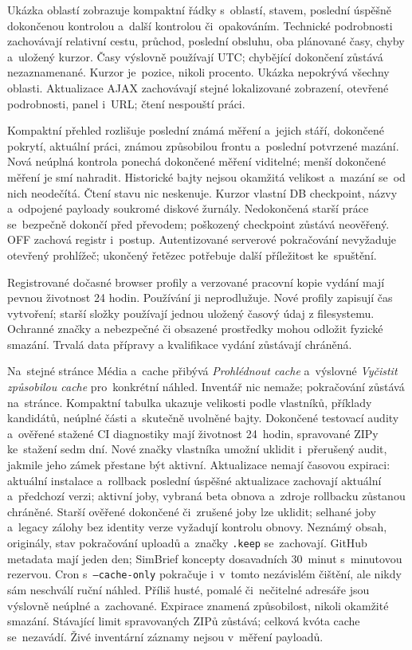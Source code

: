 \documentclass[11pt,a4paper]{article}
\begin{document}
Ukázka oblastí zobrazuje kompaktní řádky s~oblastí, stavem, poslední úspěšně
dokončenou kontrolou a~další kontrolou či~opakováním. Technické podrobnosti
zachovávají relativní cestu, průchod, poslední obsluhu, oba plánované časy,
chyby a~uložený kurzor. Časy výslovně používají UTC; chybějící dokončení zůstává
nezaznamenané. Kurzor je~pozice, nikoli procento. Ukázka nepokrývá všechny
oblasti. Aktualizace AJAX zachovávají stejné lokalizované zobrazení, otevřené
podrobnosti, panel i~URL; čtení nespouští práci.

Kompaktní přehled rozlišuje poslední známá měření a~jejich stáří, dokončené
pokrytí, aktuální práci, známou způsobilou frontu a~poslední potvrzené mazání.
Nová neúplná kontrola ponechá dokončené měření viditelné; menší dokončené měření
je smí nahradit. Historické bajty nejsou okamžitá velikost a~mazání se~od nich
neodečítá. Čtení stavu nic neskenuje. Kurzor vlastní DB checkpoint, názvy
a~odpojené payloady soukromé diskové žurnály. Nedokončená starší práce
se~bezpečně dokončí před převodem; poškozený checkpoint zůstává neověřený. OFF
zachová registr i~postup. Autentizované serverové pokračování nevyžaduje
otevřený prohlížeč; ukončený řetězec potřebuje další příležitost ke~spuštění.

Registrované dočasné browser profily a verzované pracovní kopie vydání mají
pevnou životnost 24 hodin. Používání ji neprodlužuje. Nové profily zapisují čas
vytvoření; starší složky používají jednou uložený časový údaj z filesystemu.
Ochranné značky a nebezpečné či obsazené prostředky mohou odložit fyzické
smazání.
Trvalá data přípravy a kvalifikace vydání zůstávají chráněná.

Na~stejné stránce Média a~cache přibývá \emph{Prohlédnout cache} a~výslovné
\emph{Vyčistit způsobilou cache} pro~konkrétní náhled. Inventář nic nemaže;
pokračování zůstává na~stránce. Kompaktní tabulka ukazuje velikosti podle
vlastníků,
příklady kandidátů, neúplné části a~skutečně uvolněné bajty. Dokončené testovací
audity a~ověřené stažené CI diagnostiky mají životnost 24~hodin, spravované ZIPy
ke~stažení sedm dní. Nové značky vlastníka umožní uklidit i~přerušený audit,
jakmile jeho zámek přestane být aktivní. Aktualizace nemají časovou expiraci:
aktuální instalace a~rollback poslední úspěšné aktualizace zachovají aktuální
a~předchozí verzi; aktivní joby, vybraná beta obnova a~zdroje rollbacku zůstanou
chráněné. Starší ověřené dokončené či~zrušené joby lze uklidit; selhané joby
a~legacy zálohy bez identity verze vyžadují kontrolu obnovy. Neznámý obsah,
originály, stav pokračování uploadů a~značky \texttt{.keep} se~zachovají.
GitHub metadata mají jeden den; SimBrief koncepty dosavadních 30~minut
s~minutovou rezervou. Cron s~\texttt{--cache-only} pokračuje i~v~tomto
nezávislém
čištění, ale nikdy sám neschválí ruční náhled. Příliš husté, pomalé či~nečitelné
adresáře jsou výslovně neúplné a~zachované. Expirace znamená způsobilost,
nikoli okamžité smazání. Stávající limit spravovaných ZIPů zůstává;
celková kvóta cache se~nezavádí. Živé inventární záznamy nejsou v~měření
payloadů.
\end{document}
